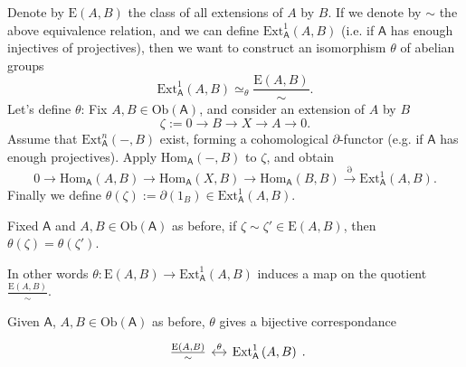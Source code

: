 \begin{rem}
	Denote by $\mathrm{E}(A,B)$ the class of all extensions of $A$ by $B$.
	If we denote by $\sim$ the above equivalence relation, and we can
	define $\mathrm{Ext}^{ 1}_{ \mathsf{A}} \left( A, B \right)$ (i.e. if $\mathsf{A}$
	has enough injectives of projectives), then we want to construct an isomorphism
	$\theta$ of abelian groups
	\begin{equation}
	\mathrm{Ext}^{ 1}_{ \mathsf{A}} \left( A, B \right) \simeq_{\theta}
	\frac{\mathrm{E}(A,B)}{\sim}
	.\end{equation} 
	Let's define $\theta$:
	Fix $A,B \in \mathrm{Ob} \left(\mathsf{A}\right)$, and consider an extension of $A$ by $B$
	\begin{equation}
	\zeta := 0 \to B \to X \to A \to 0
	.\end{equation} 
	Assume that $\mathrm{Ext}^{ n}_{ \mathsf{A}} \left( -, B \right)$ exist,
	forming a cohomological $\partial$-functor (e.g. if $\mathsf{A}$ has enough
	projectives).
	Apply $\mathrm{Hom}_{\mathsf{A}} \left( -, B \right)$ to $\zeta$, and obtain
	\begin{equation}
	0 \to \mathrm{Hom}_{\mathsf{A}} \left( A, B \right) \to \mathrm{Hom}_{\mathsf{A}} \left( X, B \right) \to 
	\mathrm{Hom}_{\mathsf{A}} \left( B, B \right) \xrightarrow{\partial} \mathrm{Ext}^{ 1}_{ \mathsf{A}} \left( A, B \right)
	.\end{equation} 
	Finally we define $\theta(\zeta) := \partial(1_B) \in \mathrm{Ext}^{ 1}_{ \mathsf{A}} \left( A, B \right)$.
\end{rem}

\begin{lem}
	Fixed $\mathsf{A}$ and $A,B \in \mathrm{Ob} \left(\mathsf{A}\right)$ as before, 
	if $\zeta \sim \zeta' \in \mathrm{E}(A,B)$, then $\theta(\zeta) = \theta(\zeta')$.

	In other words $\theta: \mathrm{E}(A,B) \to \mathrm{Ext}^{ 1}_{ \mathsf{A}} \left( A, B \right)$
	induces a map on the quotient $\frac{\mathrm{E}(A,B)}{\sim}$.
\end{lem} 

\begin{thm}[]
	Given $\mathsf{A}$, $A,B \in \mathrm{Ob} \left(\mathsf{A}\right)$ as before,
	$\theta$ gives a bijective correspondance
	\begin{equation}
	\begin{tikzcd}[column sep=small]
		\frac{\mathrm{E}(A,B)}{\sim} \arrow[r, "\theta", leftrightarrow] &
		\mathrm{Ext}^{ 1}_{ \mathsf{A}} \left( A, B \right)
	\end{tikzcd}
	.\end{equation} 
\end{thm}

